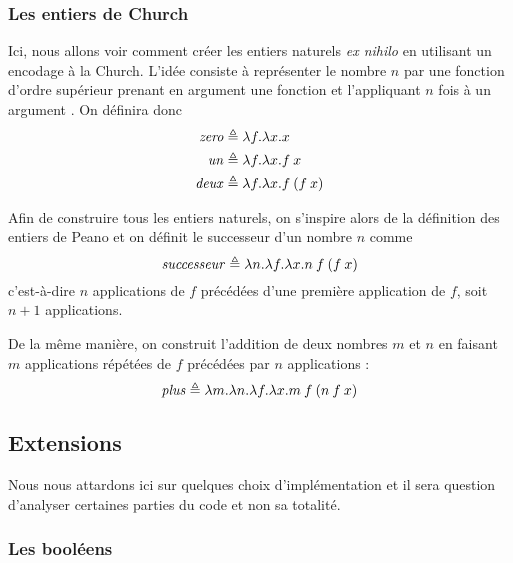 \documentclass {article}
\theoremstyle{definition}
\theoremstyle{remark}
\begin{document}
\subsubsection{Les entiers de Church}

\newcommand{\Zero}{\mathit{zero}}
\newcommand{\Un}{\mathit{un}}
\newcommand{\Deux}{\mathit{deux}}
\newcommand{\Succ}{\mathit{successeur}}
\newcommand{\Plus}{\mathit{plus}}


Ici, nous allons voir comment créer les entiers naturels \textit{ex
  nihilo} en utilisant un encodage à la Church. L'idée consiste à
représenter le nombre \(n\) par une fonction d'ordre supérieur prenant
en argument une fonction  et l'appliquant \(n\) fois à un
argument . On définira donc
%
\begin{align*}
\Zero &\triangleq \Lam{f}{\Lam{x}{x}}\\ 
\Un   &\triangleq \Lam{f}{\Lam{x}{\App{f}{x}}} \\
\Deux &\triangleq \Lam{f}{\Lam{x}{\App{f}{(\App{f}{x}})}}
\end{align*}

Afin de construire tous les entiers naturels, on s'inspire alors de la
définition des entiers de Peano et on définit le successeur d'un nombre \(n\)
comme
%
\[
\Succ \triangleq \Lam{n}{\Lam{f}{\Lam{x}{\App{\App{n}{f}}{(\App{f}{x})}}}}
\]
%
c'est-à-dire \(n\) applications de \(f\) précédées d'une première
application de \(f\), soit \(n+1\) applications.

De la même manière, on construit l'addition de deux nombres \(m\) et
\(n\) en faisant \(m\) applications répétées de \(f\) précédées par
\(n\) applications :
%
\[
\Plus \triangleq \Lam{m}{\Lam{n}{\Lam{f}{\Lam{x}{\App{\App{m}{f}}{(\App{\App{n}{f}}{x}})}}}}
\]


\subsection{Extensions}

Nous nous attardons ici sur quelques choix d'implémentation et il
sera question d'analyser certaines parties du code et non sa totalité.

\subsubsection{Les booléens}

\newcommand{\NTrue}{\lstinline!True!}
\newcommand{\NFalse}{\lstinline!False!}
\newcommand{\NIfte}{\lstinline!IfThenElse!}
\end{document}
